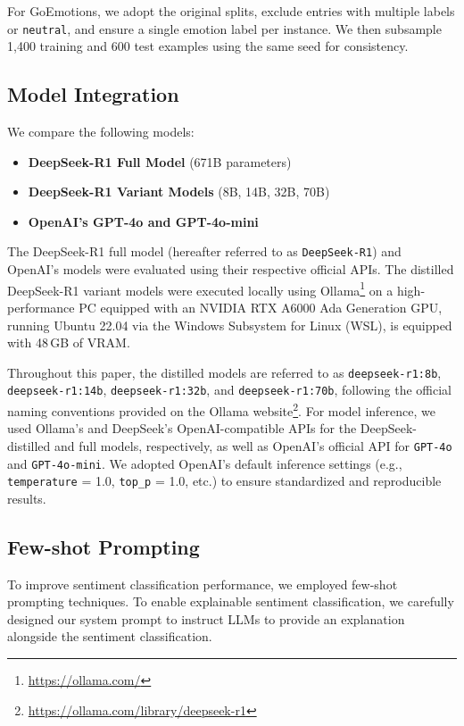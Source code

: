 \documentclass{IEEEcsmag}
\begin{document}
For GoEmotions, we adopt the original splits, exclude entries with multiple labels or \texttt{neutral}, and ensure a single emotion label per instance. We then subsample 1,400 training and 600 test examples using the same seed for consistency.

\vspace{-15pt}
\subsection{Model Integration}

We compare the following models:

\begin{itemize}[itemsep=1pt, topsep=1pt, leftmargin=*]
    \item \textbf{DeepSeek-R1 Full Model} (671B parameters)
    \item \textbf{DeepSeek-R1 Variant  Models} (8B, 14B, 32B, 70B)
    \item \textbf{OpenAI's GPT-4o and GPT-4o-mini}
\end{itemize}

The DeepSeek-R1 full model (hereafter referred to as \texttt{DeepSeek-R1}) and OpenAI's models were evaluated using their respective official APIs. The distilled DeepSeek-R1 variant models were executed locally using Ollama\footnote{\url{https://ollama.com/}} on a high-performance PC equipped with an NVIDIA RTX A6000 Ada Generation GPU,
running Ubuntu 22.04 via the Windows Subsystem for Linux (WSL), is equipped with 48\,GB of VRAM.

Throughout this paper, the distilled models are referred to as \texttt{deepseek-r1:8b}, \texttt{deepseek-r1:14b}, \texttt{deepseek-r1:32b}, and \texttt{deepseek-r1:70b}, following the official naming conventions provided on the Ollama website\footnote{\url{https://ollama.com/library/deepseek-r1}}. For model inference, we used Ollama’s and DeepSeek’s OpenAI-compatible APIs for the DeepSeek-distilled and full models, respectively, as well as OpenAI’s official API for \texttt{GPT-4o} and \texttt{GPT-4o-mini}. We adopted OpenAI’s default inference settings (e.g., \texttt{temperature} = 1.0, \texttt{top\_p} = 1.0, etc.) to ensure standardized and reproducible results.

\vspace{-15pt}
\subsection{Few-shot Prompting}
To improve sentiment classification performance, we employed few-shot prompting techniques. To enable explainable sentiment classification, we carefully designed our system prompt to instruct LLMs to provide an explanation alongside the sentiment classification.
\end{document}
